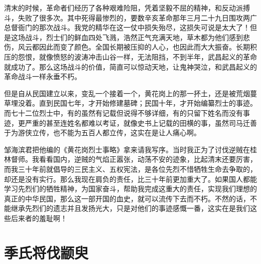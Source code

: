 \documentclass[12pt,UTF-8,openany]{ctexbook}
\begin{document}
\begin{normalsize}
    
    清末的时候，革命者们经历了各种艰难险阻，凭着坚毅不屈的精神，和反动派搏斗，失败了很多次。其中死得最惨烈的，要数辛亥革命那年三月二十九日围攻两广总督衙门的那次战斗。我党的精华在这一仗中损失殆尽，这损失可说是太大了！但是这场战斗，烈士们的鲜血四处飞溅，浩然正气充满天地，草木都为他们感到悲伤，风云都因此而变了颜色。全国长期被压抑的人心，也因此而大大振奋。长期积压的怨恨，就像愤怒的波涛冲击山谷一样，无法阻挡，不到半年，武昌起义的革命就成功了。那么这场战斗的价值，简直可以惊动天地，让鬼神哭泣，和武昌起义的革命战斗一样永垂不朽。
    
    但是自从民国建立以来，变乱一个接着一个，黄花岗上的那一抔土，还是被荒烟蔓草埋没着。直到民国七年，才开始修建墓碑；民国十年，才开始编纂烈士的事迹。而七十二位烈士中，有的虽然有记载但说得不够详细，有的只留下姓名而没有事迹，更严重的甚至连姓名都难以考证，就像史书上记载的田横的事，虽然司马迁善于为游侠立传，也不能为五百人都立传，这实在是让人痛心啊。
    
    邹海滨君把他编的《黄花岗烈士事略》拿来请我写序。当时我正为了讨伐逆贼在桂林督师。我看看国内，逆贼的气焰正嚣张，动荡不安的迹象，比起清末还要厉害，而我三十年前就倡导的三民主义、五权宪法，是各位先烈不惜牺牲生命去争取的，却还是没有实行。那么我现在肩负的责任，比三十年前更加重大了。如果国人都能学习先烈们的牺牲精神，为国家奋斗，帮助我完成这重大的责任，实现我们理想的真正的中华民国，那么这一部开国的血史，就可以流传下去而不朽。不然的话，不能继承先烈们的遗志并且发扬光大，只是对他们的事迹感慨一番，这实在是我们这些后来者的羞耻啊！
    
    
    
\end{normalsize}



\chapter{季氏将伐颛臾}
\end{document}
